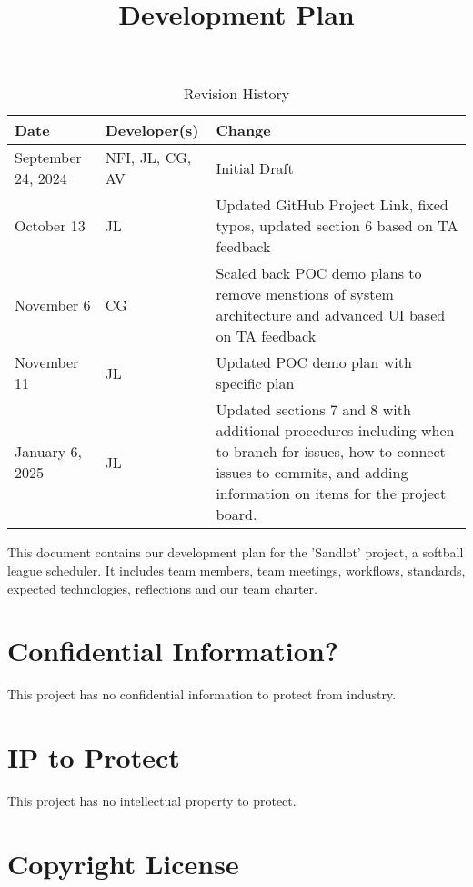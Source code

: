 \documentclass{article}
\title{Development Plan\\\progname}
\author{\authname}
\date{}
\begin{document}
\maketitle

\begin{table}[hp]
\caption{Revision History} \label{TblRevisionHistory}
\begin{tabularx}{\textwidth}{llX}
\toprule
\textbf{Date} & \textbf{Developer(s)} & \textbf{Change}\\
\midrule
September 24, 2024 & NFI, JL, CG, AV & Initial Draft\\
October 13 & JL & Updated GitHub Project Link, fixed typos, updated section 6 based on TA feedback\\
November 6 & CG & Scaled back POC demo plans to remove menstions of system architecture and advanced UI based on TA feedback\\
November 11 & JL & Updated POC demo plan with specific plan\\
January 6, 2025 & JL & Updated sections 7 and 8 with additional procedures including when to branch for issues, how to connect issues to commits, and adding information on items for the project board.\\
\bottomrule
\end{tabularx}
\end{table}

\newpage{}

This document contains our development plan for the 'Sandlot' project, a
softball league scheduler. It includes team members, team meetings, workflows,
standards, expected technologies, reflections and our team charter.

\section{Confidential Information?}

This project has no confidential information to protect from industry.

\section{IP to Protect}

This project has no intellectual property to protect.

\section{Copyright License}
\end{document}
